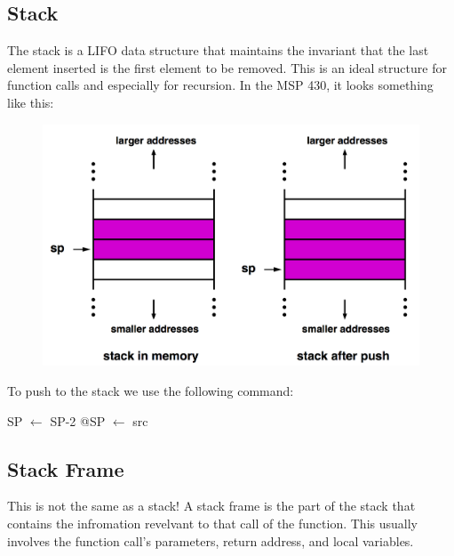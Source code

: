 \documentclass{hw}
\begin{document}
\subsection{Stack}
The stack is a LIFO data structure that maintains the invariant that the last 
element inserted is the first element to be removed. This is an ideal structure
for function calls and especially for recursion. In the MSP 430, it looks something
like this:
\begin{figure}[H]
  \centering
  \includegraphics[scale=.4]{img/stack}
\end{figure}
To push to the stack we use the following command:
\begin{C}
  SP $\leftarrow$ SP-2
  @SP $\leftarrow$ src
\end{C}

\subsection{Stack Frame}
This is not the same as a stack! A stack frame is the part of the stack that contains
the infromation revelvant to that call of the function. This usually involves the
function call's parameters, return address, and local variables.
\end{document}
